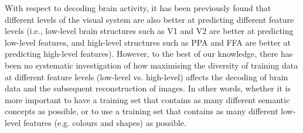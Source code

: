 With respect to decoding brain activity, it has been previously found that different levels of the visual system are also better at predicting different feature levels (i.e., low-level brain structures such as V1 and V2 are better at predicting low-level features, and high-level structures such as PPA and FFA are better at predicting high-level features)\cite{horikawaGenericDecodingSeen2017}. However, to the best of our knowledge, there has been no systematic investigation of how maximising the diversity of training data at different feature levels (low-level vs. high-level) affects the decoding of brain data and the subsequent reconstruction of images. In other words, whether it is more important to have a training set that contains as many different semantic concepts as possible, or to use a training set that contains as many different low-level features (e.g. colours and shapes) as possible. 





